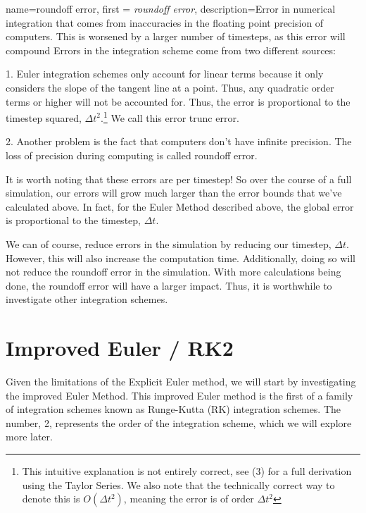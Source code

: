 \documentclass[12pt]{report}
\begin{document}
{
    name=roundoff error,
    first = {\textit{roundoff error}},
    description={Error in numerical integration that comes from inaccuracies in the floating point precision of computers. This is worsened by a larger number of timesteps, as this error will compound}
}
Errors in the integration scheme come from two different sources:

1. Euler integration schemes only account for linear terms because it only considers the slope of the tangent line at a point. Thus, any quadratic order terms or higher will not be accounted for. Thus, the error is proportional to the timestep squared, $\Delta t^2$.\footnote{This intuitive explanation is not entirely correct, see (3) for a full derivation using the Taylor Series. We also note that the technically correct way to denote this is $O(\Delta t^2)$, meaning the error is of order $\Delta t^2$} We call this error \gls{trunc error}.

2. Another problem is the fact that computers don’t have infinite precision. The loss of precision during computing is called \gls{roundoff error}.

It is worth noting that these errors are per timestep! So over the course of a full simulation, our errors will grow much larger than the error bounds that we’ve calculated above. In fact, for the Euler Method described above, the global error is proportional to the timestep, $\Delta t$.

We can of course, reduce errors in the simulation by reducing our timestep, $\Delta t$. However, this will also increase the computation time. Additionally, doing so will not reduce the \gls{roundoff error} in the simulation. With more calculations being done, the \gls{roundoff error} will have a larger impact. Thus, it is worthwhile to investigate other integration schemes.

\section{Improved Euler / RK2}
Given the limitations of the Explicit Euler method, we will start by investigating the improved Euler Method. This improved Euler method is the first of a family of integration schemes known as Runge-Kutta (RK) integration schemes. The number, 2, represents the order of the integration scheme, which we will explore more later.
\end{document}
